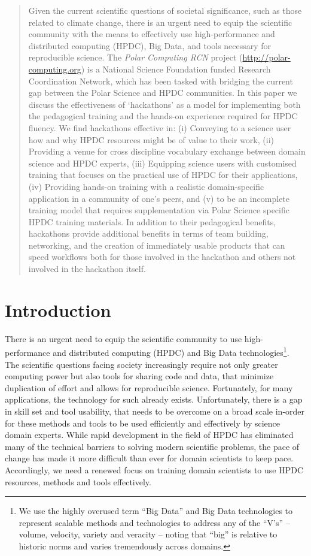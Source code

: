 \documentclass[conference]{IEEEtran}
\begin{document}
\begin{abstract}
Given the current scientific questions of societal significance, such as those related to climate change, there is an urgent need to equip the scientific community with the means to effectively use high-performance and distributed computing (HPDC), Big Data, and tools necessary for reproducible science.  The {\it Polar Computing RCN} project (\url{http://polar-computing.org}) is a National Science Foundation funded Research Coordination Network, which has been tasked with bridging the current gap between the Polar Science and HPDC communities. In this paper we discuss the effectiveness of ‘hackathons’ as a model for implementing both the pedagogical training and the hands-on experience required for HPDC fluency.  We find hackathons effective in: (i) Conveying to a science user how and why HPDC resources might be of value to their work, (ii) Providing a venue for cross discipline vocabulary exchange between domain science and HPDC experts, (iii) Equipping science users with customised training that focuses on the practical use of HPDC for their applications, (iv) Providing hands-on training with a realistic domain-specific application in a community of one’s peers, and (v) to be an incomplete training model that requires supplementation via Polar Science specific HPDC training materials. In addition to their pedagogical benefits, hackathons provide additional benefits in terms of team building, networking, and the creation of immediately usable products that can speed workflows both for those involved in the hackathon and others not involved in the hackathon itself. 
\end{abstract}


\section{Introduction}
There is an urgent need to equip the scientific community to use high-performance and distributed computing (HPDC) and Big Data technologies\footnote{ We use the highly overused term “Big Data” and Big Data technologies to represent scalable methods and technologies to address any of the “V’s”  -- volume, velocity, variety and veracity -- noting that “big” is relative to historic norms and varies tremendously across domains.}. The scientific questions facing society increasingly require not only greater computing power but also tools for sharing code and data, that minimize duplication of effort and allows for reproducible science. Fortunately, for many applications, the technology for such already exists. Unfortunately, there is a gap in skill set and tool usability, that needs to be overcome on a broad scale in-order for these methods and tools to be used efficiently and effectively by science domain experts. While rapid development in the field of HPDC has eliminated many of the technical barriers to solving modern scientific problems, the pace of change has made it more difficult than ever for domain scientists to keep pace. Accordingly, we need a renewed focus on training domain scientists to use HPDC resources, methods and tools effectively. 
\end{document}
